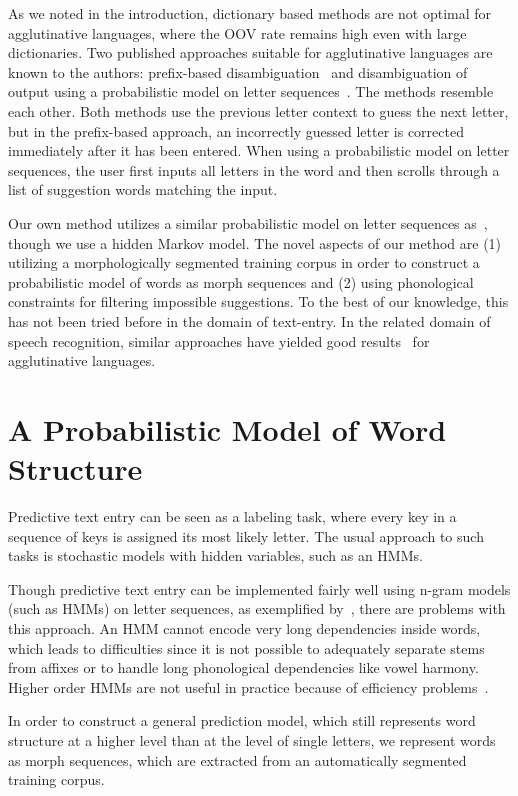 \documentclass{llncs}
\begin{document}
As we noted in the introduction, dictionary based methods are not
optimal for agglutinative languages, where the OOV rate remains high
even with large dictionaries. Two published approaches suitable for
agglutinative languages are known to the authors: prefix-based
disambiguation~\cite{Mackenzie01letterwise:prefix-based} and
disambiguation of output using a probabilistic model on letter
sequences~\cite{Tantug:2010}. The methods resemble each other. Both
methods use the previous letter context to guess the next letter, but
in the prefix-based approach, an incorrectly guessed letter is
corrected immediately after it has been entered. When using a
probabilistic model on letter sequences, the user first inputs all
letters in the word and then scrolls through a list of suggestion
words matching the input.

Our own method utilizes a similar probabilistic model on letter
sequences as~\cite{Tantug:2010}, though we use a hidden Markov
model. The novel aspects of our method are (1) utilizing a
morphologically segmented training corpus in order to construct a
probabilistic model of words as morph sequences and (2) using
phonological constraints for filtering impossible suggestions. To the
best of our knowledge, this has not been tried before in the domain of
text-entry. In the related domain of speech recognition, similar
approaches have yielded good results~\cite{Creutz_morph-basedspeech}
for agglutinative languages.

\section{A Probabilistic Model of Word Structure}\label{model}

Predictive text entry can be seen as a labeling task, where every key
in a sequence of keys is assigned its most likely letter. The usual
approach to such tasks is stochastic models with hidden variables,
such as an HMMs.

Though predictive text entry can be implemented fairly well using
n-gram models (such as HMMs) on letter sequences, as exemplified
by~\cite{Tantug:2010}, there are problems with this approach. An HMM
cannot encode very long dependencies inside words, which leads to
difficulties since it is not possible to adequately separate stems
from affixes or to handle long phonological dependencies like vowel
harmony. Higher order HMMs are not useful in practice because of
efficiency problems~\cite{Tantug:2010}.

In order to construct a general prediction model, which still
represents word structure at a higher level than at the level of
single letters, we represent words as morph sequences, which are
extracted from an automatically segmented training corpus.
\end{document}
